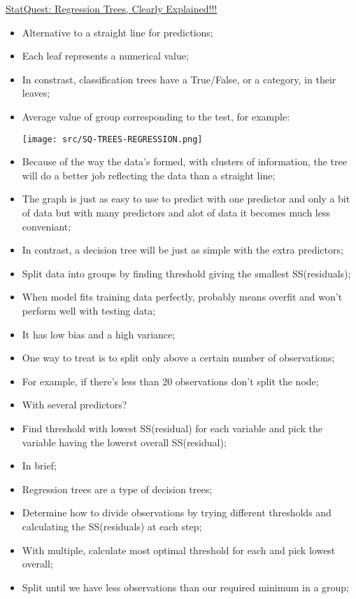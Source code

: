 \documentclass[12pt, titlepage, french]{report}
\begin{document}
\begin{YTB_SUMM}[label = TREES-REGRESSION]{\href{https://www.youtube.com/watch?v=g9c66TUylZ4&list=PLblh5JKOoLUICTaGLRoHQDuF_7q2GfuJF&index=36}{StatQuest: Regression Trees, Clearly Explained!!!}}
\begin{itemize}
	\item	Alternative to a straight line for predictions;
	\item	Each leaf represents a numerical value;
	\item[]	In constrast, classification trees have a True/False, or a category, in their leaves;
	\item	Average value of group corresponding to the test, for example:
	
	\texttt{[image: src/SQ-TREES-REGRESSION.png]}
	\item	Because of the way the data's formed, with clusters of information, the tree will do a better job reflecting the data than a straight line;
	\item	The graph is just as easy to use to predict with one predictor and only a bit of data but with many predictors and alot of data it becomes much less conveniant;
	\item[]	In contrast, a decision tree will be just as simple with the extra predictors;
	\item	Split data into groups by finding threshold giving the smallest SS(residuals);
	\item	When model fits training data perfectly, probably means overfit and won't perform well with testing data;
	\item[]	It has low bias and a high variance;
	\item	One way to treat is to split only above a certain number of observations;
	\item[]	For example, if there's less than 20 observations don't split the node;
%	
	\item	With several predictors?
	\item[]	Find threshold with lowest SS(residual) for each variable and pick the variable having the lowerst overall SS(residual);
	\item	In brief;
	\item[]	Regression trees are a type of decision trees;
	\item[]	Determine how to divide observations by trying different thresholds and calculating the SS(residuals) at each step;
	\item[]	With multiple, calculate most optimal threshold for each and pick lowest overall;
	\item[]	Split until we have less observations than our required minimum in a group;
\end{itemize}
\end{YTB_SUMM}
\end{document}
